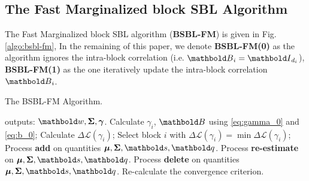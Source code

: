 \subsection{The Fast Marginalized block SBL Algorithm}
The Fast Marginalized block SBL algorithm ({\bf BSBL-FM})
is given in Fig. \ref{algo:bsbl-fm},
In the remaining of this paper, we denote
{\bf BSBL-FM(0)} as the algorithm ignores the intra-block correlation (i.e.
$\ve{B}_i=\ve{I}_{d_i}$), {\bf BSBL-FM(1)} as the one iteratively update 
the intra-block correlation $\ve{B}_i$.

\begin{algorithm}[!htb]
\caption{The BSBL-FM Algorithm.}\label{algo:bsbl-fm}
\begin{algorithmic}[1]
\STATE outputs: $\ve{w},\bm{\Sigma},\bm{\gamma}$.
\STATE Calculate $\gamma_i$, $\ve{B}$ using \eqref{eq:gamma_0} and \eqref{eq:b_0};
\STATE Calculate $\Delta \mathcal{L}(\gamma_i)$;
\STATE Select block $i$ with $\Delta\mathcal{L}(\gamma_i)=\min\Delta\mathcal{L}(\gamma_i)$;
\STATE Process {\bf add} on quantities $\bm{\mu},\bm{\Sigma},\ve{s},\ve{q}$.
\STATE Process {\bf re-estimate} on $\bm{\mu},\bm{\Sigma},\ve{s},\ve{q}$.
\STATE Process {\bf delete} on quantities $\bm{\mu},\bm{\Sigma},\ve{s},\ve{q}$.
\ENDIF
\STATE Re-calculate the convergence criterion.
\ENDWHILE
\end{algorithmic}
\end{algorithm}

